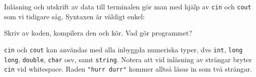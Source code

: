 Inläsning och utskrift av data till terminalen gör man med hjälp av \texttt{cin} och \texttt{cout} som vi tidigare såg. Syntaxen är väldigt enkel:



Skriv av koden, kompilera den och kör. Vad gör programmet?

\texttt{cin} och \texttt{cout} kan användas med alla inbyggda numeriska typer, dvs \texttt{int}, \texttt{long long}, \texttt{double}, \texttt{char} osv, samt \texttt{string}. Notera att vid inläsning av strängar bryter \texttt{cin} vid whitespace. Raden \texttt{"hurr durr"} kommer alltså läsas in som två strängar.
